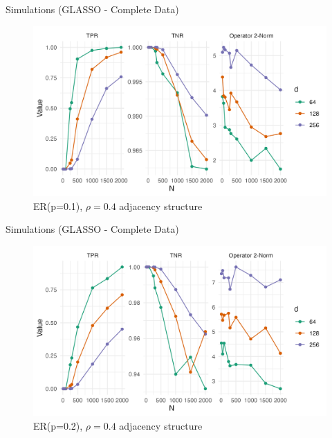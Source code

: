 \documentclass{beamer}
\begin{document}
\begin{frame}{Simulations (GLASSO - Complete Data)}
    \begin{figure}
        \centering 
        \includegraphics[scale=0.65]{glasso_complete_ER_FixN_1.png}
        \caption{ER(p=0.1), $\rho=0.4$ adjacency structure}
    \end{figure}
\end{frame}


\begin{frame}{Simulations (GLASSO - Complete Data)}
    \begin{figure}
        \centering 
        \includegraphics[scale=0.65]{glasso_complete_ER_FixN_2.png}
        \caption{ER(p=0.2), $\rho=0.4$ adjacency structure}
    \end{figure}
\end{frame}
\end{document}
